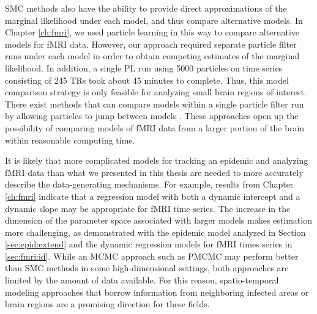 SMC methods also have the ability to provide direct approximations of the marginal likelihood under each model, and thus compare alternative models. In Chapter \ref{ch:fmri}, we used particle learning in this way to compare alternative models for fMRI data. However, our approach required separate particle filter runs under each model in order to obtain competing estimates of the marginal likelihood. In addition, a single PL run using 5000 particles on time series consisting of 245 TRs took about 45 minutes to complete. Thus, this model comparison strategy is only feasible for analyzing small brain regions of interest. There exist methods that can compare models within a single particle filter run by allowing particles to jump between models \citep{berz:gilks:rmcross:2001,zhou:joh:smcmodcomp:2013}. These approaches open up the possibility of comparing models of fMRI data from a larger portion of the brain within reasonable computing time.

It is likely that more complicated models for tracking an epidemic \citep{Sham:Kars:pnas:2012, Bhad:Ioni:mala:2011} and analyzing fMRI data \citep{buxton:balloon:1998} than what we presented in this thesis are needed to more accurately describe the data-generating mechanisms. For example, results from Chapter \ref{ch:fmri} indicate that a regression model with both a dynamic intercept and a dynamic slope may be appropriate for fMRI time series. The increase in the dimension of the parameter space associated with larger models makes estimation more challenging, as demonstrated with the epidemic model analyzed in Section \ref{sec:epid:extend} and the dynamic regression models for fMRI times series in \ref{sec:fmri:id}. While an MCMC approach such as PMCMC may perform better than SMC methods in some high-dimensional settings, both approaches are limited by the amount of data available. For this reason, spatio-temporal modeling approaches that borrow information from neighboring infected areas or brain regions are a promising direction for these fields. 